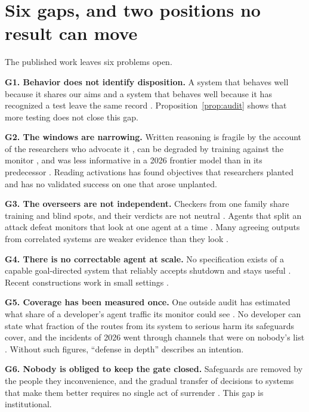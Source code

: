 \documentclass[10pt,twocolumn]{article}
\theoremstyle{plain}
\theoremstyle{definition}
\newcommand{\para}[1]{\smallskip\noindent\textbf{#1}\enspace}
\begin{document}
\section{Six gaps, and two positions no result can move}\label{sec:gaps}

The published work leaves six problems open.

\para{G1. Behavior does not identify disposition.} A system that behaves well because it
shares our aims and a system that behaves well because it has recognized a test leave the
same record \cite{schoen2025}. Proposition~\ref{prop:audit} shows that more testing does not
close this gap.

\para{G2. The windows are narrowing.} Written reasoning is fragile by the account of the
researchers who advocate it \cite{korbak2025}, can be degraded by training against the monitor
\cite{baker2025}, and was less informative in a 2026 frontier model than in its predecessor
\cite{openai2026astra}. Reading activations has found objectives that researchers planted
\cite{marks2025} and has no validated success on one that arose unplanted.

\para{G3. The overseers are not independent.} Checkers from one family share training and
blind spots, and their verdicts are not neutral \cite{anthropic2026judges}. Agents that split
an attack defeat monitors that look at one agent at a time \cite{makins2026}. Many agreeing
outputs from correlated systems are weaker evidence than they look \cite{bowkis2026}.

\para{G4. There is no correctable agent at scale.} No specification exists of a capable
goal-directed system that reliably accepts shutdown and stays useful \cite{soares2015}.
Recent constructions work in small settings \cite{hudson2026}.

\para{G5. Coverage has been measured once.} One outside audit has estimated what share of a
developer's agent traffic its monitor could see \cite{metr2026audit}. No developer can state
what fraction of the routes from its system to serious harm its safeguards cover, and the
incidents of 2026 went through channels that were on nobody's list
\cite{metr2026,anthropic2026cyber}. Without such figures, ``defense in depth'' describes an
intention.

\para{G6. Nobody is obliged to keep the gate closed.} Safeguards are removed by the people
they inconvenience, and the gradual transfer of decisions to systems that make them better
requires no single act of surrender \cite{kulveit2025}. This gap is institutional.
\end{document}
